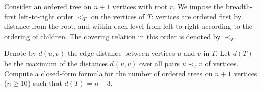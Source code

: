 Consider an ordered tree on $n+1$ vertices with root $r$. We impose the breadth-first left-to-right order $<_T$ on the vertices of $T$: vertices are ordered first by distance from the root, and within each level from left to right according to the ordering of children. The covering relation in this order is denoted by $\prec_T$.

Denote by $d(u,v)$ the edge-distance between vertices $u$ and $v$ in $T$. Let $d(T)$ be the maximum of the distances $d(u,v)$ over all pairs $u \prec_T v$ of vertices. Compute a closed-form formula for the number of ordered trees on $n+1$ vertices ($n \geq 10$) such that $d(T) = n - 3$.
